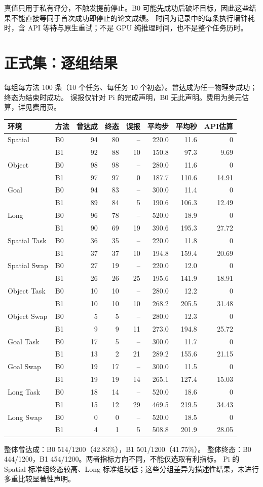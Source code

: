 \documentclass[UTF8,11pt,a4paper]{ctexart}
\begin{document}
真值只用于私有评分，不触发提前停止。B0 可能先成功后破坏目标，因此这些结果不能直接等同于首次成功即停止的论文成绩。
时间为记录中的每条执行墙钟耗时，含 API 等待与原生重试；不是 GPU 纯推理时间，也不是整个任务历时。
\newpage
\section{正式集：逐组结果}
每组每方法 100 条（10 个任务、每任务 10 个初态）。曾达成为任一物理步成功；终态为结束时成功。
误报仅针对 Pi 的完成声明，B0 无此声明。费用为美元估算，详见费用页。
\begin{center}\small
\begin{tabular}{llrrrrrr}
\toprule
环境 & 方法 & 曾达成 & 终态 & 误报 & 平均步 & 平均秒 & API估算\\
\midrule
Spatial & B0 & 94 & 80 & -- & 220.0 & 11.6 & 0\\
 & B1 & 92 & 88 & 10 & 150.8 & 97.3 & 9.69\\
Object & B0 & 98 & 98 & -- & 280.0 & 11.6 & 0\\
 & B1 & 97 & 97 & 0 & 187.7 & 110.6 & 14.91\\
Goal & B0 & 94 & 83 & -- & 300.0 & 11.4 & 0\\
 & B1 & 89 & 84 & 5 & 190.6 & 106.3 & 12.49\\
Long & B0 & 96 & 78 & -- & 520.0 & 18.9 & 0\\
 & B1 & 90 & 69 & 19 & 390.6 & 195.3 & 27.72\\
\midrule
Spatial Task & B0 & 36 & 35 & -- & 220.0 & 11.8 & 0\\
 & B1 & 37 & 37 & 10 & 194.8 & 159.4 & 20.69\\
Spatial Swap & B0 & 27 & 19 & -- & 220.0 & 12.0 & 0\\
 & B1 & 26 & 26 & 25 & 195.6 & 141.9 & 18.91\\
Object Task & B0 & 10 & 10 & -- & 280.0 & 12.2 & 0\\
 & B1 & 10 & 10 & 10 & 268.2 & 205.5 & 31.48\\
Object Swap & B0 & 5 & 5 & -- & 280.0 & 12.3 & 0\\
 & B1 & 9 & 9 & 11 & 273.0 & 194.8 & 25.72\\
Goal Task & B0 & 17 & 5 & -- & 300.0 & 11.7 & 0\\
 & B1 & 13 & 2 & 21 & 289.2 & 155.6 & 21.15\\
Goal Swap & B0 & 19 & 17 & -- & 300.0 & 11.5 & 0\\
 & B1 & 19 & 19 & 14 & 265.1 & 127.4 & 15.03\\
Long Task & B0 & 18 & 14 & -- & 520.0 & 18.6 & 0\\
 & B1 & 15 & 12 & 29 & 469.5 & 219.5 & 34.43\\
Long Swap & B0 & 0 & 0 & -- & 520.0 & 18.5 & 0\\
 & B1 & 4 & 1 & 5 & 508.8 & 201.9 & 28.05\\
\bottomrule
\end{tabular}
\end{center}
整体曾达成：B0 514/1200（42.83\%），B1 501/1200（41.75\%）。
整体终态：B0 444/1200，B1 454/1200。两者指标方向不同，不能仅选取有利指标。
Pi 的 Spatial 标准组终态较高、Long 标准组较低；这些分组差异为描述性结果，未进行多重比较显著性声明。
\newpage
\end{document}
